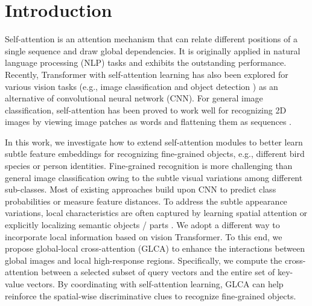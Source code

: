 \section{Introduction}

Self-attention is an attention mechanism that can relate different positions of a single sequence and draw global dependencies. It is originally applied in natural language processing (NLP) tasks \cite{vaswani2017attention,devlin2018bert} and exhibits the outstanding performance. Recently, Transformer with self-attention learning has also been explored for various vision tasks (e.g., image classification \cite{dosovitskiy2020image,chen2020generative,touvron2020training,ramachandran2019stand,hu2019lrnet,wang2020axial} and object detection \cite{carion2020detr,zhu2020deformable}) as an alternative of convolutional neural network (CNN). For general image classification, self-attention has been proved to work well for recognizing 2D images by viewing image patches as words and flattening them as sequences \cite{dosovitskiy2020image,touvron2020training}.

In this work, we investigate how to extend self-attention modules to better learn subtle feature embeddings for recognizing fine-grained objects, e.g., different bird species or person identities. Fine-grained recognition is more challenging than general image classification owing to the subtle visual variations among different sub-classes. Most of existing approaches build upon CNN to predict class probabilities or measure feature distances. To address the subtle appearance variations, local characteristics are often captured by learning spatial attention \cite{fu2017look,zheng2017learning,sun2018multi,luo2019cross} or explicitly localizing semantic objects / parts \cite{zheng2019looking,ding2019selective,yang2018learning, zhang2019learning}.
We adopt a different way to incorporate local information based on vision Transformer. To this end, we propose global-local cross-attention (GLCA) to enhance the interactions between global images and local high-response regions. Specifically, we compute the cross-attention between a selected subset of query vectors and the entire set of key-value vectors. By coordinating with self-attention learning, GLCA can help reinforce the spatial-wise discriminative clues to recognize fine-grained objects.

